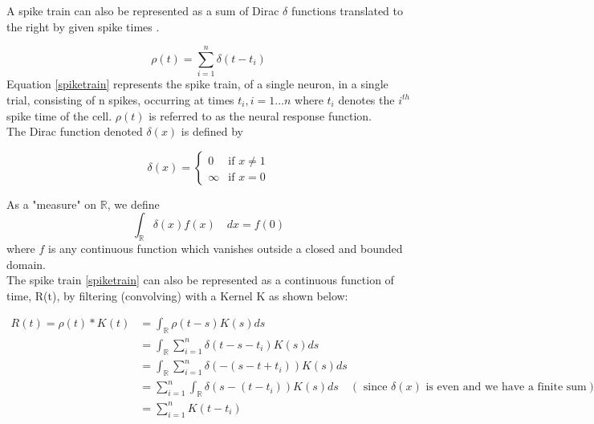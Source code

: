 A spike train can also be represented as a sum of Dirac $\delta$ functions translated to the right by given spike times \cite{Dayan2001}.


\begin{equation}\label{spiketrain}
 \rho(t) = \sum_{i=1}^{n} \delta(t-t_{i})  
\end{equation}
Equation \eqref{spiketrain} represents the spike train, of a single neuron, in a single trial, consisting of n spikes, occurring at times $t_{i}, i = 1 \ldots n$ where $t_{i}$ denotes the $i^{th}$ spike time of the cell.  
$\rho(t)$ is referred to as the neural response function.\\


The Dirac  function denoted $\delta(x)$ is defined by
\begin{Def}
\[
  \delta(x) =
  \begin{cases}
                                   0 & \text{if $x \neq 1$} \\
                                   \infty & \text{if $x=0$} 
  \end{cases}
\]
\end{Def}
As a "measure" on $\mathbb{R}$, we define
\begin{equation} \label{DiracDelta}
\displaystyle \int_{\mathbb{R}}  \delta(x)f(x) \quad dx = f(0) 
\end{equation}
where $f$ is any continuous function which vanishes outside a closed 
and bounded domain.\\

The  spike train \eqref{spiketrain} can also be represented as a continuous function of time, R(t), by filtering (convolving) with a Kernel K as shown below:

\begin{align*}
\displaystyle
R(t) = \rho(t)*K(t) &= \int_{\mathbb{R}} \rho(t-s)K(s)  ds \\
& = \int_{\mathbb{R}}    \sum_{i=1}^{n} \delta(t - s -t_{i}) K(s)  ds  \\
& =  \int_{\mathbb{R}}    \sum_{i=1}^{n} \delta( -(s - t + t_{i})) K(s)  ds\\
& =  \sum_{i=1}^{n}   \int_{\mathbb{R}} \delta(s - (t - t_{i})) K(s)  ds \quad (\text{ since $\delta(x)$ is even and we have a finite sum})\\
& = \sum_{i=1}^{n} K(t-t_{i}) 
\end{align*}

